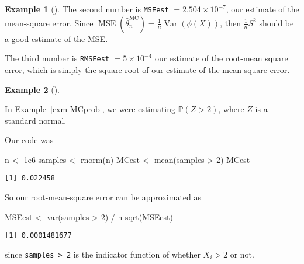 \documentclass[
  letterpaper,
  DIV=11,
  numbers=noendperiod]{scrreprt}
\newenvironment{Shaded}{\begin{snugshade}}{\end{snugshade}}
\newcommand{\DecValTok}[1]{\textcolor[rgb]{0.68,0.00,0.00}{#1}}
\newcommand{\FloatTok}[1]{\textcolor[rgb]{0.68,0.00,0.00}{#1}}
\newcommand{\FunctionTok}[1]{\textcolor[rgb]{0.28,0.35,0.67}{#1}}
\newcommand{\NormalTok}[1]{\textcolor[rgb]{0.00,0.23,0.31}{#1}}
\newcommand{\OtherTok}[1]{\textcolor[rgb]{0.00,0.23,0.31}{#1}}
\newcommand{\SpecialCharTok}[1]{\textcolor[rgb]{0.37,0.37,0.37}{#1}}
\theoremstyle{plain}
\theoremstyle{definition}
\theoremstyle{definition}
\newtheorem{example}{Example}[chapter]
\theoremstyle{remark}
\begin{document}
\begin{example}[]
The second number is \texttt{MSEest}
\(= \ensuremath{2.504\times 10^{-7}}\), our estimate of the mean-square
error. Since
\(\operatorname{MSE}(\widehat{\theta}_n^{\mathrm{MC}}) = \frac{1}{n} \operatorname{Var}(\phi(X))\),
then \(\frac{1}{n} S^2\) should be a good estimate of the MSE.

The third number is \texttt{RMSEest} \(= \ensuremath{5\times 10^{-4}}\)
our estimate of the root-mean square error, which is simply the
square-root of our estimate of the mean-square error.

\end{example}

\begin{example}[]\protect\hypertarget{exm-MCprob2}{}\label{exm-MCprob2}

In Example~\ref{exm-MCprob}, we were estimating \(\mathbb P(Z > 2)\),
where \(Z\) is a standard normal.

Our code was

\begin{Shaded}
\begin{Highlighting}[]
\NormalTok{n }\OtherTok{\textless{}{-}} \FloatTok{1e6}
\NormalTok{samples }\OtherTok{\textless{}{-}} \FunctionTok{rnorm}\NormalTok{(n)}
\NormalTok{MCest }\OtherTok{\textless{}{-}} \FunctionTok{mean}\NormalTok{(samples }\SpecialCharTok{\textgreater{}} \DecValTok{2}\NormalTok{)}
\NormalTok{MCest}
\end{Highlighting}
\end{Shaded}

\begin{verbatim}
[1] 0.022458
\end{verbatim}

So our root-mean-square error can be approximated as

\begin{Shaded}
\begin{Highlighting}[]
\NormalTok{MSEest }\OtherTok{\textless{}{-}} \FunctionTok{var}\NormalTok{(samples }\SpecialCharTok{\textgreater{}} \DecValTok{2}\NormalTok{) }\SpecialCharTok{/}\NormalTok{ n}
\FunctionTok{sqrt}\NormalTok{(MSEest)}
\end{Highlighting}
\end{Shaded}

\begin{verbatim}
[1] 0.0001481677
\end{verbatim}

since \texttt{samples\ \textgreater{}\ 2} is the indicator function of
whether \(X_i > 2\) or not.

\end{example}
\end{document}
